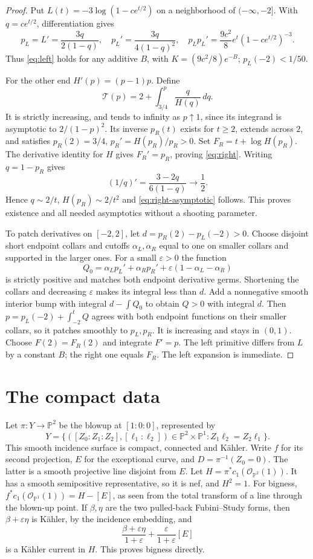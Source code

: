 \documentclass[11pt]{article}
\newcommand{\CP}{\mathbb P}
\begin{document}
\begin{proof}
Put $L(t)=-3\log(1-ce^{t/2})$ on a neighborhood of $(-\infty,-2]$.
With $q=ce^{t/2}$, differentiation gives
\[
 p_L=L'=\frac{3q}{2(1-q)},\quad p_L'=\frac{3q}{4(1-q)^2},\quad
 p_Lp_L'=\frac{9c^2}8e^t(1-ce^{t/2})^{-3}.
\]
Thus \eqref{eq:left} holds for any additive $B$, with
$K=(9c^2/8)e^{-B}$; $p_L(-2)<1/50$.

For the other end $H'(p)=(p-1)p$. Define
\[
 \mathcal T(p)=2+\int_{3/4}^p\frac{q}{H(q)}\,dq.
\]
It is strictly increasing, and tends to infinity as $p\uparrow1$,
since its integrand is asymptotic to $2/(1-p)^2$. Its inverse $p_R(t)$
exists for $t\geq2$, extends across $2$, and satisfies
$p_R(2)=3/4$, $p_R'=H(p_R)/p_R>0$. Set
$F_R=t+\log H(p_R)$. The derivative identity for $H$ gives
$F_R'=p_R$, proving \eqref{eq:right}.
Writing $q=1-p_R$ gives
\[
 (1/q)'=\frac{3-2q}{6(1-q)}\longrightarrow\frac12.
\]
Hence $q\sim2/t$, $H(p_R)\sim2/t^2$ and
\eqref{eq:right-asymptotic} follows. This proves existence and all
needed asymptotics without a shooting parameter.

To patch derivatives on $[-2,2]$, let $d=p_R(2)-p_L(-2)>0$.
Choose disjoint short endpoint collars and cutoffs $\alpha_L,\alpha_R$
equal to one on smaller collars and supported in the larger ones. For
a small $\varepsilon>0$ the function
\[
 Q_0=\alpha_Lp_L'+\alpha_Rp_R'
              +\varepsilon(1-\alpha_L-\alpha_R)
\]
is strictly positive and matches both endpoint derivative germs.
Shortening the collars and decreasing $\varepsilon$ makes its integral
less than $d$. Add a nonnegative smooth interior bump with integral
$d-\int Q_0$ to obtain $Q>0$ with integral $d$.
Then $p=p_L(-2)+\int_{-2}^tQ$ agrees with both endpoint functions
on their smaller collars, so it patches smoothly to $p_L,p_R$.
It is increasing and stays in $(0,1)$. Choose $F(2)=F_R(2)$ and
integrate $F'=p$. The left primitive differs from $L$ by a constant $B$;
the right one equals $F_R$. The left expansion is immediate.
\end{proof}

\section{The compact data}
Let $\pi:Y\to\CP^2$ be the blowup at $[1:0:0]$, represented by
\[
 Y=\{([Z_0:Z_1:Z_2],[\ell_1:\ell_2])\in\CP^2\times\CP^1:
                                      Z_1\ell_2=Z_2\ell_1\}.
\]
This smooth incidence surface is compact, connected and K\"ahler.
Write $f$ for its second projection, $E$ for the exceptional curve,
and $D=\pi^{-1}(Z_0=0)$. The latter is a smooth projective line
disjoint from $E$. Let $H=\pi^*c_1(\mathcal O_{\CP^2}(1))$.
It has a smooth semipositive representative, so it is nef, and $H^2=1$.
For bigness, $f^*c_1(\mathcal O_{\CP^1}(1))=H-[E]$, as seen from
the total transform of a line through the blown-up point. If $\beta,\eta$
are the two pulled-back Fubini--Study forms, then $\beta+\varepsilon\eta$
is K\"ahler, by the incidence embedding, and
\[
 \frac{\beta+\varepsilon\eta}{1+\varepsilon}
                         +\frac\varepsilon{1+\varepsilon}[E]
\]
is a K\"ahler current in $H$. This proves bigness directly.
\end{document}
